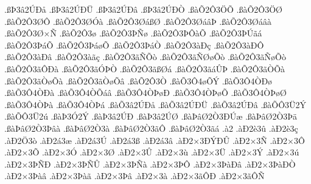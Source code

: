 {.^^df^^de3^^e22^^da^^d0^^e5
.^^df^^de3^^e22^^da^^d0^^dc
.^^df^^de3^^e22^^da^^d0^^e2
.^^df^^de3^^e22^^da^^d0^^d2
.^^df^^e0^^d52^^d43^^d6^^d5
.^^df^^e0^^d52^^d43^^d6^^d8
.^^df^^e0^^d52^^d43^^d8^^d4
.^^df^^e0^^d52^^d43^^d8^^d3^^e0
.^^df^^e0^^d52^^d43^^d8^^e1^^df^^d8
.^^df^^e0^^d52^^d43^^d8^^e1^^e2^^de
.^^df^^e0^^d52^^d43^^d8^^e1^^e2^^e0
.^^df^^e0^^d52^^d43^^d8^^d7^^d1
.^^df^^e0^^d52^^d43^^f8
.^^df^^e0^^d52^^d43^^de^^d1^^f8
.^^df^^e0^^d52^^d43^^de^^d4^^e0^^d5
.^^df^^e0^^d52^^d43^^de^^da^^e3^^e1
.^^df^^e0^^d52^^d43^^de^^e1^^d5
.^^df^^e0^^d52^^d43^^de^^e1^^f8^^d5
.^^df^^e0^^d52^^d43^^de^^e1^^d2
.^^df^^e0^^d52^^d43^^e0^^d0^^e7
.^^df^^e0^^d52^^d43^^e0^^d0^^d4
.^^df^^e0^^d52^^d43^^e0^^d0^^e2
.^^df^^e0^^d52^^d43^^e0^^e3^^e7
.^^df^^e0^^d52^^d43^^e3^^d1^^d5^^f2
.^^df^^e0^^d52^^d43^^e3^^d1^^d8^^f8^^d5^^f2
.^^df^^e0^^d52^^d43^^e3^^d1^^f8^^d5^^f2
.^^df^^e0^^d52^^d43^^e3^^d4^^d0^^e0
.^^df^^e0^^d52^^d43^^e3^^d3^^de^^d2
.^^df^^e0^^d52^^d43^^e3^^df^^d8^^e1
.^^df^^e0^^d52^^d43^^e3^^e1^^db^^de
.^^df^^e0^^d52^^d43^^e3^^d2^^d5^^e0
.^^df^^e0^^d52^^d43^^e3^^d2^^f8^^d5^^e0
.^^df^^e0^^d52^^d43^^e3^^d2^^f8^^d5^^e2
.^^df^^e0^^d52^^d43^^d2
.^^df^^e0^^d53^^d44^^f8^^d5^^dd
.^^df^^e0^^d53^^d44^^d2^^d0^^f8
.^^df^^e0^^d53^^d44^^d2^^d0^^e0
.^^df^^e0^^d53^^d44^^d2^^d5^^e1^^e2
.^^df^^e0^^d53^^d44^^d2^^de^^f8^^d0
.^^df^^e0^^d53^^d44^^d2^^de^^f8^^d5
.^^df^^e0^^d53^^d44^^d2^^de^^f8^^d8
.^^df^^e0^^d53^^d44^^d2^^de^^e0
.^^df^^e0^^d53^^d44^^d2^^de^^e1
.^^df^^e0^^d53^^e22^^da^^d0^^e5
.^^df^^e0^^d53^^e22^^da^^d0^^dc
.^^df^^e0^^d53^^e22^^da^^d0^^e2
.^^df^^e0^^d5^^d43^^dc2^^dd
.^^df^^e0^^d5^^d43^^dc2^^fa
.^^df^^e0^^de3^^d32^^dd
.^^df^^e0^^de3^^e22^^da^^d0
.^^df^^e0^^de3^^e22^^da^^d8
.^^df^^e0^^de^^e2^^d82^^d23^^d0^^da^^e6
.^^df^^e0^^de^^e2^^d82^^d23^^de^^e4
.^^df^^e0^^de^^e2^^d82^^d23^^de^^e2^^e0
.^^df^^e0^^de^^e2^^d82^^d23^^e0
.^^df^^e0^^de^^e2^^d82^^d23^^e3^^d4
.^^df^^e0^^de^^e2^^d82^^d23^^e3^^e1
.^^e02
.^^e0^^d02^^e83^^fb
.^^e0^^d02^^e83^^e7
.^^e0^^d02^^d63^^f2
.^^e0^^d02^^e13^^e6
.^^e0^^d02^^e13^^da
.^^e0^^d02^^e13^^df
.^^e0^^d02^^e13^^e2
.^^e0^^d02^^d73^^d0^^dd^^d0^^db
.^^e0^^d02^^d73^^d1
.^^e0^^d02^^d73^^d4
.^^e0^^d02^^d73^^d5
.^^e0^^d02^^d73^^d3
.^^e0^^d02^^d73^^d8
.^^e0^^d02^^d73^^db
.^^e0^^d02^^d73^^f9
.^^e0^^d02^^d73^^dc
.^^e0^^d02^^d73^^dd
.^^e0^^d02^^d73^^fa
.^^e0^^d02^^d73^^de^^d1^^d0
.^^e0^^d02^^d73^^de^^d1^^db
.^^e0^^d02^^d73^^de^^d1^^e0
.^^e0^^d02^^d73^^de^^d4
.^^e0^^d02^^d73^^de^^e0^^d0^^e2
.^^e0^^d02^^d73^^de^^e0^^d0^^d2
.^^e0^^d02^^d73^^de^^e0^^e2
.^^e0^^d02^^d73^^de^^e0^^e3
.^^e0^^d02^^d73^^de^^e2
.^^e0^^d02^^d73^^e0
.^^e0^^d02^^d73^^e3^^d4^^d0
.^^e0^^d02^^d73^^e3^^d4^^d1
}
